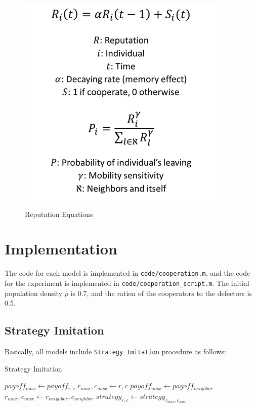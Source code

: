 \documentclass[11pt]{article}
\begin{document}
\begin{figure}[!htbp]
	\centering
	\includegraphics[scale=0.7]{../../other/reputation_eq.png}
    \caption{Reputation Equations}
    \label{fig:reputationeq}
\end{figure}



\section{Implementation}
The code for each model is implemented in \verb|code/cooperation.m|, and the code for the experiment is implemented in \verb|code/cooperation_script.m|. The initial population density $\rho$ is 0.7, and the ration of the cooperators to the defectors is 0.5.

\subsection{Strategy Imitation}
Basically, all models include \verb|Strategy Imitation| procedure as follows:

\begin{algorithm}[!htbp]
  \caption{Strategy Imitation}\label{imitation}
  \begin{algorithmic}[1]
      \State $payoff_{max} \gets payoff_{r,c}$
      \State $r_{max},c_{max} \gets r,c$
        \State $payoff_{max} \gets payoff_{neighbor}$
        \State $r_{max},c_{max} \gets r_{neighbor},c_{neighbor}$
        \EndIf
      \EndFor
      \State $strategy_{r,c} \gets strategy_{r_{max},c_{max}}$   
    \EndProcedure
  \end{algorithmic}
\end{algorithm}
\end{document}
